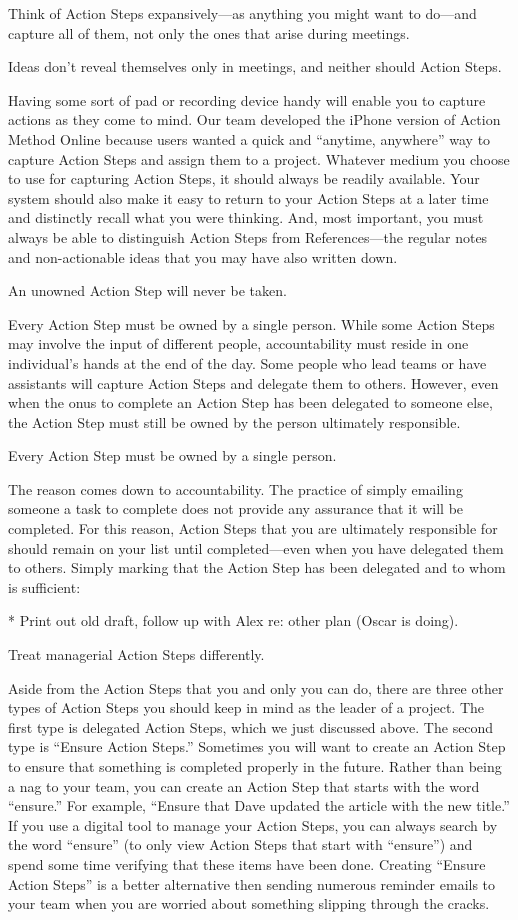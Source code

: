 Think of Action Steps expansively—as anything you might want to do—and capture all of them, not only the ones that arise during meetings.

Ideas don’t reveal themselves only in meetings, and neither should Action Steps.

Having some sort of pad or recording device handy will enable you to capture actions as they come to mind. Our team developed the iPhone version of Action Method Online because users wanted a quick and “anytime, anywhere” way to capture Action Steps and assign them to a project. Whatever medium you choose to use for capturing Action Steps, it should always be readily available. Your system should also make it easy to return to your Action Steps at a later time and distinctly recall what you were thinking. And, most important, you must always be able to distinguish Action Steps from References—the regular notes and non-actionable ideas that you may have also written down.

An unowned Action Step will never be taken.

Every Action Step must be owned by a single person. While some Action Steps may involve the input of different people, accountability must reside in one individual’s hands at the end of the day. Some people who lead teams or have assistants will capture Action Steps and delegate them to others. However, even when the onus to complete an Action Step has been delegated to someone else, the Action Step must still be owned by the person ultimately responsible.

Every Action Step must be owned by a single person.

The reason comes down to accountability. The practice of simply emailing someone a task to complete does not provide any assurance that it will be completed. For this reason, Action Steps that you are ultimately responsible for should remain on your list until completed—even when you have delegated them to others. Simply marking that the Action Step has been delegated and to whom is sufficient:

   * Print out old draft, follow up with Alex re: other plan (Oscar is doing).

Treat managerial Action Steps differently.

Aside from the Action Steps that you and only you can do, there are three other types of Action Steps you should keep in mind as the leader of a project. The first type is delegated Action Steps, which we just discussed above. The second type is “Ensure Action Steps.” Sometimes you will want to create an Action Step to ensure that something is completed properly in the future. Rather than being a nag to your team, you can create an Action Step that starts with the word “ensure.” For example, “Ensure that Dave updated the article with the new title.” If you use a digital tool to manage your Action Steps, you can always search by the word “ensure” (to only view Action Steps that start with “ensure”) and spend some time verifying that these items have been done. Creating “Ensure Action Steps” is a better alternative then sending numerous reminder emails to your team when you are worried about something slipping through the cracks.

